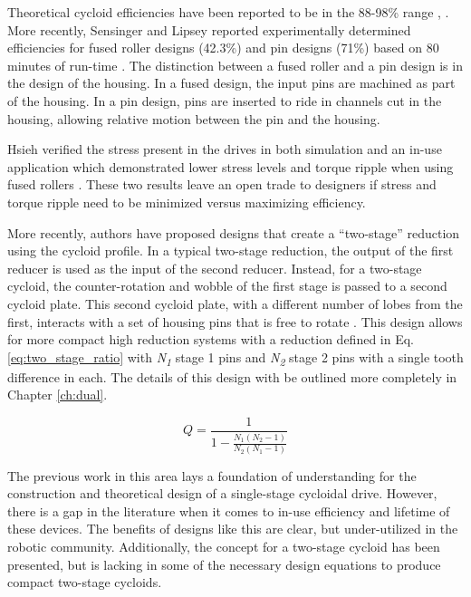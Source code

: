 Theoretical cycloid efficiencies have been reported to be in the 88-98\% range \cite{ref:malhorta_2}, \cite{ref:unified_approach}.
More recently, Sensinger and Lipsey reported experimentally determined efficiencies for fused roller designs (42.3\%) and pin designs (71\%) based on 80 minutes of run-time \cite{ref:cycloid_vs_harmonic}.
The distinction between a fused roller and a pin design is in the design of the housing.
In a fused design, the input pins are machined as part of the housing. 
In a pin design, pins are inserted to ride in channels cut in the housing, allowing relative motion between the pin and the housing.

Hsieh verified the stress present in the drives in both simulation and an in-use application which demonstrated lower stress levels and torque ripple when using fused rollers \cite{ref:hsieh_dynamics}.
These two results leave an open trade to designers if stress and torque ripple need to be minimized versus maximizing efficiency.

More recently, authors have proposed designs that create a ``two-stage'' reduction using the cycloid profile. In a typical two-stage reduction, the output of the first reducer is used as the input of the second reducer. Instead, for a two-stage cycloid, the counter-rotation and wobble of the first stage is passed to a second cycloid plate. This second cycloid plate, with a different number of lobes from the first, interacts with a set of housing pins that is free to rotate \cite{ref:new_two_stage}. This design allows for more compact high reduction systems with a reduction defined in Eq. \ref{eq:two_stage_ratio} \cite{ref:two_stage_tooth_mod} with \textit{N\textsubscript{1}} stage 1 pins and \textit{N\textsubscript{2}} stage 2 pins with a single tooth difference in each. The details of this design with be outlined more completely in Chapter \ref{ch:dual}.

\begin{equation} \label{eq:two_stage_ratio}
Q = \frac{1}{1 - \frac{N_1 (N_2-1)}{N_2 (N_1-1)}}
\end{equation}

The previous work in this area lays a foundation of understanding for the construction and theoretical design of a single-stage cycloidal drive. However, there is a gap in the literature when it comes to in-use efficiency and lifetime of these devices. The benefits of designs like this are clear, but under-utilized in the robotic community. Additionally, the concept for a two-stage cycloid has been presented, but is lacking in some of the necessary design equations to produce compact two-stage cycloids. 
\\
\\
\\
